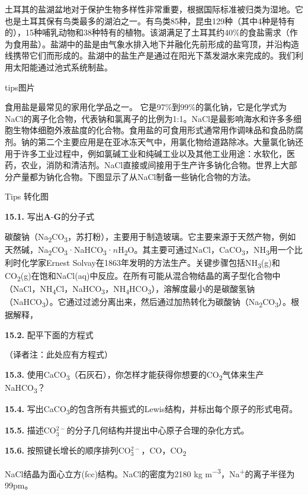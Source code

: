 土耳其的盐湖盆地对于保护生物多样性非常重要，根据国际标准被归类为湿地。它也是土耳其保有鸟类最多的湖泊之一。有鸟类85种，昆虫129种（其中4种是特有的），15种哺乳动物和38种特有的植物。该湖满足了土耳其约40\%的食盐需求（作为食用盐）。盐湖中的盐是由气象水排入地下并融化先前形成的盐穹顶，并沿构造线携带它们而形成的。盐湖中的盐生产是通过在阳光下蒸发湖水来完成的。我们利用太阳能通过池式系统制盐。

tips图片

食用盐是最常见的家用化学品之一。
它是97\%到99\%的氯化钠，它是化学式为NaCl的离子化合物，代表钠和氯离子的比例为1:1。NaCl是最影响海水和许多多细胞生物体细胞外液盐度的化合物。食用盐的可食用形式通常用作调味品和食品防腐剂。钠的第二个主要应用是在亚冰冻天气中，用氯化物给道路除冰。大量氯化钠还用于许多工业过程中，例如氯碱工业和纯碱工业以及其他工业用途：水软化，医药，农业，消防和清洁剂。NaCl直接或间接用于生产许多钠化合物。世界上大部分产量都为钠化合物。下图显示了从NaCl制备一些钠化合物的方法。

Tips 转化图

\noindent\textbf{15.1.} 写出\textbf{A}-\textbf{G}的分子式

碳酸钠（Na\textsubscript{2}CO\textsubscript{3}，苏打粉），主要用于制造玻璃。它主要来源于天然产物，例如天然碱，Na\textsubscript{2}CO\textsubscript{3}·NaHCO\textsubscript{3}·$n$H\textsubscript{2}O。其主要可通过NaCl，CaCO\textsubscript{3}，NH\textsubscript{3}用一个比利时化学家Ernest Solvay在1863年发明的方法生产。关键步骤包括NH\textsubscript{3}(g)和CO\textsubscript{2}(g)在饱和NaCl(aq)中反应。在所有可能从混合物结晶的离子型化合物中（NaCl，NH\textsubscript{4}Cl，NaHCO\textsubscript{3}，NH\textsubscript{4}HCO\textsubscript{3}），溶解度最小的是碳酸氢钠（NaHCO\textsubscript{3}）。它通过过滤分离出来，然后通过加热转化为碳酸钠（Na\textsubscript{2}CO\textsubscript{3}）。根据解释，

\noindent\textbf{15.2.} 配平下面的方程式

（译者注：此处应有方程式）

\noindent\textbf{15.3.}
使用CaCO\textsubscript{3}（石灰石），你怎样才能获得你想要的CO\textsubscript{2}气体来生产NaHCO\textsubscript{3}？

\noindent\textbf{15.4.}
写出CaCO\textsubscript{3}的包含所有共振式的Lewis结构，并标出每个原子的形式电荷。

\noindent\textbf{15.5.}
描述CO$_3^{2-}$的分子几何结构并提出中心原子合理的杂化方式。

\noindent\textbf{15.6.}
按照键长增长的顺序排列CO$_3^{2-}$，CO，CO\textsubscript{2}

NaCl结晶为面心立方(fcc)结构。NaCl的密度为2180
kg m\textsuperscript{−3}，Na\textsuperscript{+}的离子半径为99pm。


